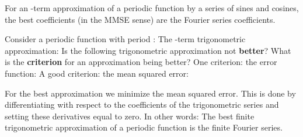\EMhold


\begin{EMtheorem}{}

For an -term approximation of a periodic function  by a series of sines and cosines, the best coefficients (in the MMSE sense) are the Fourier series coefficients.

\end{EMtheorem}

Consider a periodic function with period \EMim{2\pi}:
The -term trigonometric approximation:
Is the following trigonometric approximation not \textbf{better}?
What is the \textbf{criterion} for an approximation being better? One criterion: the error function:
A good criterion: the mean squared error:

\begin{EMproof}

For the best approximation we minimize the mean squared error. This is done by differentiating  with respect to the coefficients of the trigonometric series and setting these derivatives equal to zero. In other words:
The best finite trigonometric approximation of a periodic function is the finite Fourier series.

\end{EMproof}

